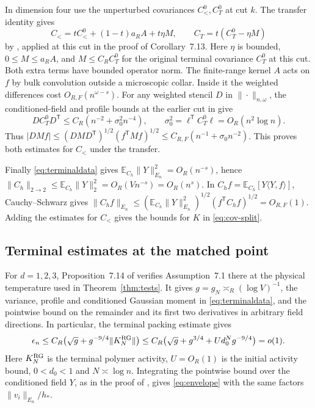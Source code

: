 \documentclass[11pt]{article}
\numberwithin{equation}{section}
\newcommand{\E}{\mathbb E}
\newcommand{\ip}[2]{\langle #1,#2\rangle}
\begin{document}
In dimension four use the unperturbed covariances $C_<^0,C_T^0$ at
cut $k$. The transfer identity gives
\begin{equation}
 C_<=tC_<^0+(1-t)a_R A+t\eta M,\qquad
 C_T=t(C_T^0-\eta M)
\end{equation}
by \cite[Lemma~5.4, Eq.~(5.19)]{base}, applied at this cut in
the proof of Corollary~7.13. Here
$\eta$ is bounded, $0\le M\le a_R A$, and $M\le C_R C_T^0$ for the
original terminal covariance $C_T^0$ at this cut. Both extra terms
have bounded operator norm. The finite-range kernel $A$ acts on $f$
by bulk convolution outside a microscopic collar. Inside it the
weighted differences cost $O_{R,F}(n^{\omega-s})$.
For any weighted stencil $D$ in $\|\cdot\|_{n,\omega}$, the
conditioned-field and profile bounds at the earlier cut in \cite[proof of Corollary~7.13]{base} give
\begin{equation}
 D C_T^0 D^{\mathsf T}\le C_R(n^{-2}+\sigma_0^2 n^{-4}),\qquad
 \sigma_0^2=\ell^{\mathsf T}C_T^0\ell=O_R(n^2\log n)
 .
\end{equation}
Thus $|DMf|\le(DMD^{\mathsf T})^{1/2}(f^{\mathsf T}Mf)^{1/2}
\le C_{R,F}(n^{-1}+\sigma_0n^{-2})$. This proves both estimates for
$C_<$ under the transfer.

Finally \eqref{eq:terminaldata} gives
$\E_{C_h}\|Y\|_{E_n}^2=O_R(n^{-s})$, hence
$\|C_h\|_{2\to2}\le\E_{C_h}\|Y\|_2^2=O_R(Vn^{-s})=O_R(n^s)$.
In $C_h f=\E_{C_h}[Y\ip{Y}{f}]$, Cauchy--Schwarz gives
$\|C_h f\|_{E_n}\le(\E_{C_h}\|Y\|_{E_n}^2)^{1/2}(f^{\mathsf T}C_h f)^{1/2}
=O_{R,F}(1)$. Adding the estimates for $C_<$ gives the bounds for
$K$ in \eqref{eq:cov-split}.

\subsection{Terminal estimates at the matched point}\label{app:terminal-inputs}

For $d=1,2,3$, Proposition~7.14 of \cite{base} verifies
Assumption~7.1 there at the physical temperature used in
Theorem~\ref{thm:tests}. It gives $g=g_N\asymp_R(\log V)^{-1}$,
the variance, profile and conditioned Gaussian moment in
\eqref{eq:terminaldata}, and the pointwise bound on the remainder
and its first two derivatives in arbitrary field directions.
In particular, the terminal packing estimate
\cite[Proposition~7.2]{base} gives
\begin{equation}
 \epsilon_n\le C_R\bigl(\sqrt g+g^{-9/4}\|K_N^{\rm RG}\|\bigr)
 \le C_R\bigl(\sqrt g+g^{3/4}+U d_0^N g^{-9/4}\bigr)=o(1).
\end{equation}
Here $K_N^{\rm RG}$ is the terminal polymer activity, $U=O_R(1)$
is the initial activity bound, $0<d_0<1$ and $N\asymp\log n$.
Integrating the pointwise bound over the conditioned field $Y$, as
in the proof of \cite[Proposition~7.4]{base}, gives
\eqref{eq:envelope} with the same factors $\|v_i\|_{E_n}/h_*$.
\end{document}
